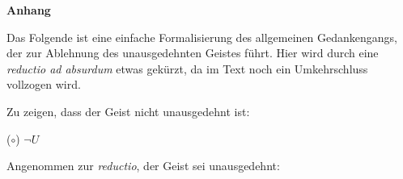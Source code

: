 \documentclass[a4paper, 12pt]{article}
\begin{document}
\begin{onehalfspace}









\end{onehalfspace}
\printbibliography

\newpage
\noindent\textbf{Anhang}
\vspace{6pt}

\noindent Das Folgende ist eine einfache Formalisierung des allgemeinen Gedankengangs, der zur Ablehnung des unausgedehnten Geistes führt. Hier wird durch eine \emph{reductio ad absurdum} etwas gekürzt, da im Text noch ein Umkehrschluss vollzogen wird. 

\vspace{14pt}

\noindent Zu zeigen, dass der Geist nicht unausgedehnt ist:

\vspace{4pt}
($\circ$) \hspace*{1em} $\neg U$

\vspace{4pt}
\noindent Angenommen zur \emph{reductio}, der Geist sei unausgedehnt:
\end{document}
